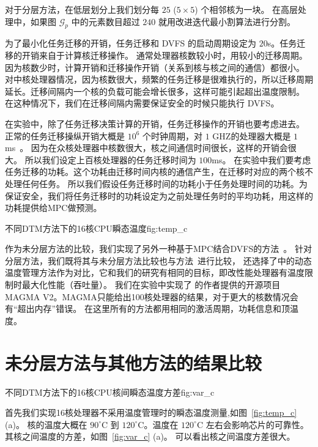 对于分层方法，在低层划分上我们划分每 $25$ ($5 \times 5$) 个相邻核为一块。
在高层处理中，如果图 $\mathcal{G}_p$ 中的元素数目超过 $240$ 就用改进迭代最小割算法进行分割。

为了最小化任务迁移的开销，任务迁移和 DVFS 的启动周期设定为 $20$s。任务迁移的开销来自于计算核迁移操作。
通常处理器核数较小时，用较小的迁移周期。因为核数少时，计算开销和迁移操作开销（关系到核与核之间的通信）都很小。
对中核处理器情况，因为核数很大，频繁的任务迁移是很难执行的，所以迁移周期延长。迁移间隔内一个核的负载可能会增长很多，这样可能引起超出温度限制。
在这种情况下，我们在迁移间隔内需要保证安全的时候只能执行 DVFS。

在实验中，除了任务迁移决策计算的开销，任务迁移操作的开销也要考虑进去。
正常的任务迁移操纵开销大概是 $10^6$ 个时钟周期，对 $1$ GHZ的处理器大概是 $1$ms~。
因为在众核处理器中核数很大，核之间通信时间很长，这样的开销会很大。
所以我们设定上百核处理器的任务迁移时间为 $100$ms。
在实验中我们要考虑任务迁移的功耗。这个功耗由迁移时间内核的通信产生，在迁移时对应的两个核不处理任何任务。
所以我们假设任务迁移时间的功耗小于任务处理时间的功耗。为保证安全，我们将任务迁移时的功耗设定为之前处理任务时的平均功耗，用这样的功耗提供给MPC做预测。

\begin{pics}{不同DTM方法下的16核CPU瞬态温度}{fig:temp_c}
 \end{pics}
 
作为未分层方法的比较，我们实现了另外一种基于MPC结合DVFS的方法~\cite{Zanini:ECCTD'09}。
针对分层方法，我们既将其与未分层方法比较也与方法~\cite{Zanini:ECCTD'09}进行比较，
还选择了\cite{Hanumaiah:TCAD'11}中的动态温度管理方法作为对比，它和我们的研究有相同的目标，即改性能处理器有温度限制时最大化性能（吞吐量）。
我们在实验中实现了 \cite{Hanumaiah:TCAD'11} 的作者提供的开源项目 MAGMA V2。MAGMA只能给出100核处理器的结果，对于更大的核数情况会有“超出内存”错误。
在这里所有的方法都用相同的激活周期，功耗信息和顶温度。
\section{未分层方法与其他方法的结果比较}\label{sec:result_c}
  

 \begin{pics}{不同DTM方法下的16核CPU核间瞬态温度方差}{fig:var_c}
 \end{pics}
 首先我们实现16核处理器不采用温度管理时的瞬态温度测量,如图~\ref{fig:temp_c} (a)。
 核的温度大概在 $90^{\circ}$C 到 $120^{\circ}$C。温度在 $120^{\circ}$C 左右会影响芯片的可靠性。其核之间温度的方差，如图~\ref{fig:var_c} (a)。
 可以看出核之间温度方差很大。
 
